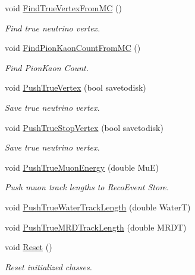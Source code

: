 \begin{DoxyCompactItemize}
\item 
void \hyperlink{classMCRecoEventLoader_a981fbf41206f4be37c40ec5fbaeb9c9d}{FindTrueVertexFromMC} ()
\begin{DoxyCompactList}\small\item\em Find true neutrino vertex. \item\end{DoxyCompactList}\item 
void \hyperlink{classMCRecoEventLoader_ade2e70b075295f19384e6862dda123ec}{FindPionKaonCountFromMC} ()
\begin{DoxyCompactList}\small\item\em Find PionKaon Count. \item\end{DoxyCompactList}\item 
void \hyperlink{classMCRecoEventLoader_a4d3d3f6e9b15bd07420b0b10f04eed11}{PushTrueVertex} (bool savetodisk)
\begin{DoxyCompactList}\small\item\em Save true neutrino vertex. \item\end{DoxyCompactList}\item 
void \hyperlink{classMCRecoEventLoader_a57ec5fa238eed8885465bf6d3e03078c}{PushTrueStopVertex} (bool savetodisk)
\begin{DoxyCompactList}\small\item\em Save true neutrino vertex. \item\end{DoxyCompactList}\item 
void \hyperlink{classMCRecoEventLoader_a253c2747d42e4112c039ecafc93ee05e}{PushTrueMuonEnergy} (double MuE)
\begin{DoxyCompactList}\small\item\em Push muon track lengths to RecoEvent Store. \item\end{DoxyCompactList}\item 
void \hyperlink{classMCRecoEventLoader_a79a348512d9c7fb13aa86e96d5f1d39b}{PushTrueWaterTrackLength} (double WaterT)
\item 
void \hyperlink{classMCRecoEventLoader_a258d351d5afce9a2be153db10a80ae3a}{PushTrueMRDTrackLength} (double MRDT)
\item 
void \hyperlink{classMCRecoEventLoader_a1c01acb2c109e46de4e1dc27911843c3}{Reset} ()
\begin{DoxyCompactList}\small\item\em Reset initialized classes. \item\end{DoxyCompactList}\end{DoxyCompactItemize}
